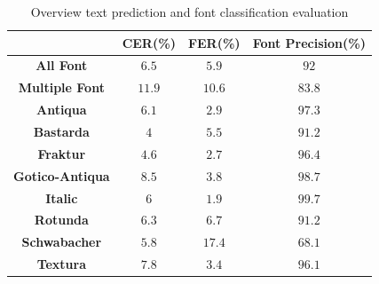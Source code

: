 \documentclass[conference]{IEEEtran}
\begin{document}
\begin{table}[htbp]
\caption{Overview text prediction and font classification evaluation}
\begin{center}
\begin{tabular}{|c|c|c|c|}
\hline
\textbf{} & CER(\%) & FER(\%) & Font Precision(\%) \\
\hline
\textbf{All Font} & $6.5$ & $5.9$  & $92$ \\
\hline
\textbf{Multiple Font} & $11.9$ & $10.6$  & $83.8$ \\
\hline
\hline
\textbf{Antiqua}  & $6.1$ & $2.9$  & $97.3$ \\
\hline
\hline
\textbf{Bastarda}  & $4$ & $5.5$  & $91.2$ \\
\hline
\hline
\textbf{Fraktur}  & $4.6$ & $2.7$  & $96.4$ \\
\hline
\hline
\textbf{Gotico-Antiqua}  & $8.5$ & $3.8$  & $98.7$ \\
\hline
\hline
\textbf{Italic}  & $6$ & $1.9$  & $99.7$ \\
\hline
\hline
\textbf{Rotunda}  & $6.3$ & $6.7$  & $91.2$ \\
\hline
\hline
\textbf{Schwabacher}  & $5.8$ & $17.4$  & $68.1$ \\
\hline
\hline
\textbf{Textura}  & $7.8$ & $3.4$  & $96.1$ \\
\hline
\end{tabular}
\label{results_class}
\end{center}
\end{table}
\end{document}

